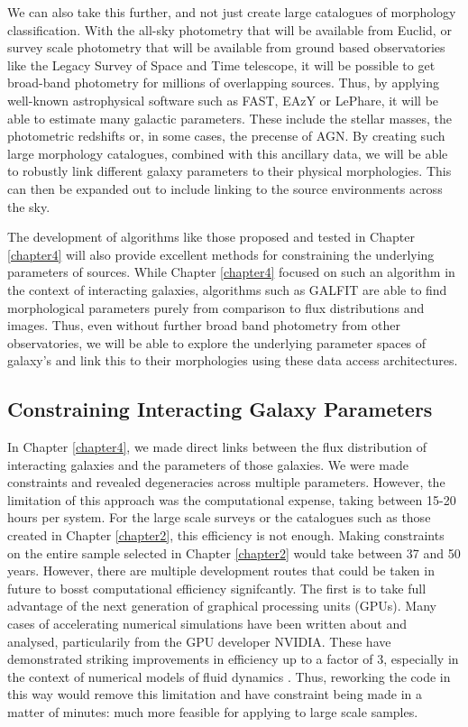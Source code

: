 We can also take this further, and not just create large catalogues of morphology classification. With the all-sky photometry that will be available from Euclid, or survey scale photometry that will be available from ground based observatories like the Legacy Survey of Space and Time telescope, it will be possible to get broad-band photometry for millions of overlapping sources. Thus, by applying well-known astrophysical software such as FAST, EAzY or LePhare, it will be able to estimate many galactic parameters. These include the stellar masses, the photometric redshifts or, in some cases, the precense of AGN. By creating such large morphology catalogues, combined with this ancillary data, we will be able to robustly link different galaxy parameters to their physical morphologies. This can then be expanded out to include linking to the source environments across the sky. 

The development of algorithms like those proposed and tested in Chapter \ref{chapter4} will also provide excellent methods for constraining the underlying parameters of sources. While Chapter \ref{chapter4} focused on such an algorithm in the context of interacting galaxies, algorithms such as GALFIT are able to find morphological parameters purely from comparison to flux distributions and images. Thus, even without further broad band photometry from other observatories, we will be able to explore the underlying parameter spaces of galaxy's and link this to their morphologies using these data access architectures. 

\subsection{Constraining Interacting Galaxy Parameters}
\noindent In Chapter \ref{chapter4}, we made direct links between the flux distribution of interacting galaxies and the parameters of those galaxies. We were made constraints and revealed degeneracies across multiple parameters. However, the limitation of this approach was the computational expense, taking between 15-20 hours per system. For the large scale surveys or the catalogues such as those created in Chapter \ref{chapter2}, this efficiency is not enough. Making constraints on the entire sample selected in Chapter \ref{chapter2} would take between 37 and 50 years. However, there are multiple development routes that could be taken in future to bosst computational efficiency signifcantly. The first is to take full advantage of the next generation of graphical processing units (GPUs). Many cases of accelerating numerical simulations have been written about and analysed, particularily from the GPU developer NVIDIA. These have demonstrated striking improvements in efficiency up to a factor of 3, especially in the context of numerical models of fluid dynamics \citep[recent examples include][]{Mantas2016, COSTA2021502}. Thus, reworking the code in this way would remove this limitation and have constraint being made in a matter of minutes: much more feasible for applying to large scale samples.

